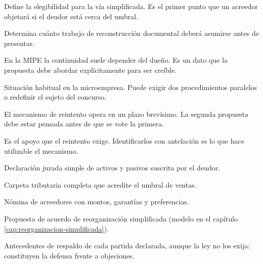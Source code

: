 \begin{cuestionario}
  {Define la elegibilidad para la vía simplificada. Es el primer punto que un acreedor
  objetará si el deudor está cerca del umbral.}

  {Determina cuánto trabajo de reconstrucción documental deberá asumirse antes de
  presentar.}

  {En la MIPE la continuidad suele depender del dueño. Es un dato que la propuesta debe
  abordar explícitamente para ser creíble.}

  {Situación habitual en la microempresa. Puede exigir dos procedimientos paralelos o
  redefinir el sujeto del concurso.}
\end{cuestionario}

\begin{cuestionario}
  {El mecanismo de reintento opera en un plazo brevísimo. La segunda propuesta debe estar
  pensada antes de que se vote la primera.}

  {Es el apoyo que el reintento exige. Identificarlos con antelación es lo que hace
  utilizable el mecanismo.}
\end{cuestionario}

\bloqueDocumental

\begin{checklist}
  \item Declaración jurada simple de activos y pasivos suscrita por el deudor.
  \item Carpeta tributaria completa que acredite el umbral de ventas.
  \item Nómina de acreedores con montos, garantías y preferencias.
  \item Propuesta de acuerdo de reorganización simplificada (modelo en el capítulo
  \ref{cap:reorganizacion-simplificada}).
  \item Antecedentes de respaldo de cada partida declarada, aunque la ley no los exija:
  constituyen la defensa frente a objeciones.
\end{checklist}

